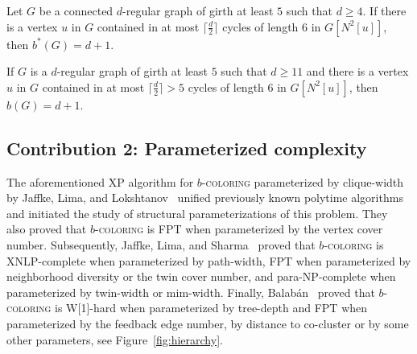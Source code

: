 \documentclass[runningheads, envcountsame]{llncs}
\newcommand{\FPT}{\textsf{FPT}\xspace}
\newcommand{\XP}{\textsf{XP}\xspace}
\newcommand{\XNLP}{\textsf{XNLP}\xspace}
\newcommand{\Wone}{\textsf{W[1]}\xspace}
\newcommand{\paraNP}{\textsf{para-NP}\xspace}
\newcommand{\bcoloring}{$b$-\textsc{coloring}\xspace}
\begin{document}
\newcommand{\thmd}{Let $G$ be a connected $d$-regular graph of girth at least $5$ such that $d \ge 4$.
If there is a vertex $u$ in $G$ contained in at most $\lceil \frac{d}{2} \rceil$ cycles of length 6 in $G[N^2[u]]$, then $b^*(G)=d+1$.}

\begin{theorem}\label{thm:d2}
\thmd
\end{theorem}

\begin{corollary}\label{cor:d2}
If $G$ is a $d$-regular graph of girth at least $5$ such that $d \ge 11$ and there is a vertex $u$ in $G$ contained in at most $\lceil \frac{d}{2} \rceil > 5$ cycles of length 6 in $G[N^2[u]]$, then $b(G)=d+1$.
\end{corollary}

\subsection*{Contribution 2: Parameterized complexity}

The aforementioned \XP algorithm for \bcoloring parameterized by clique-width by Jaffke, Lima, and Lokshtanov~\cite{JaffkeLL24} unified previously known polytime algorithms~\cite{IRVING1999127,BonomoSSV15,CamposSMS09} and initiated the study of structural parameterizations of this problem.
They~\cite{JaffkeLL24} also proved that \bcoloring is \FPT when parameterized by the vertex cover number.
Subsequently, Jaffke, Lima, and Sharma~\cite{JaffkeLS23} proved that \bcoloring is \XNLP-complete when parameterized by path-width, \FPT when parameterized by neighborhood diversity or the twin cover number, and \paraNP-complete when parameterized by twin-width or mim-width.
Finally, Balabán~\cite{DBLP:conf/mfcs/Balaban26} proved that \bcoloring is \Wone-hard when parameterized by tree-depth and \FPT when parameterized by the feedback edge number, by distance to co-cluster or by some other parameters, see Figure~\ref{fig:hierarchy}.
\end{document}
